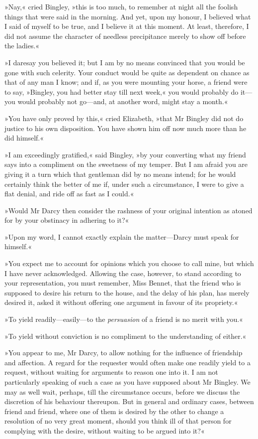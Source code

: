 »Nay,« cried Bingley, »this is too much, to remember at night all the foolish things that were said in the morning. And yet, upon my honour, I believed what I said of myself to be true, and I believe it at this moment. At least, therefore, I did not assume the character of needless precipitance merely to show off before the ladies.«

»I daresay you believed it; but I am by no means convinced that you would be gone with such celerity. Your conduct would be quite as dependent on chance as that of any man I know; and if, as you were mounting your horse, a friend were to say, »Bingley, you had better stay till next week,« you would probably do it—you would probably not go—and, at another word, might stay a month.«

»You have only proved by this,« cried Elizabeth, »that Mr Bingley did not do justice to his own disposition. You have shown him off now much more than he did himself.«

»I am exceedingly gratified,« said Bingley, »by your converting what my friend says into a compliment on the sweetness of my temper. But I am afraid you are giving it a turn which that gentleman did by no means intend; for he would certainly think the better of me if, under such a circumstance, I were to give a flat denial, and ride off as fast as I could.«

»Would Mr Darcy then consider the rashness of your original intention as atoned for by your obstinacy in adhering to it?«

»Upon my word, I cannot exactly explain the matter—Darcy must speak for himself.«

»You expect me to account for opinions which you choose to call mine, but which I have never acknowledged. Allowing the case, however, to stand according to your representation, you must remember, Miss Bennet, that the friend who is supposed to desire his return to the house, and the delay of his plan, has merely desired it, asked it without offering one argument in favour of its propriety.«

»To yield readily—easily—to the \textit{persuasion} of a friend is no merit with you.«

»To yield without conviction is no compliment to the understanding of either.«

»You appear to me, Mr Darcy, to allow nothing for the influence of friendship and affection. A regard for the requester would often make one readily yield to a request, without waiting for arguments to reason one into it. I am not particularly speaking of such a case as you have supposed about Mr Bingley. We may as well wait, perhaps, till the circumstance occurs, before we discuss the discretion of his behaviour thereupon. But in general and ordinary cases, between friend and friend, where one of them is desired by the other to change a resolution of no very great moment, should you think ill of that person for complying with the desire, without waiting to be argued into it?«

